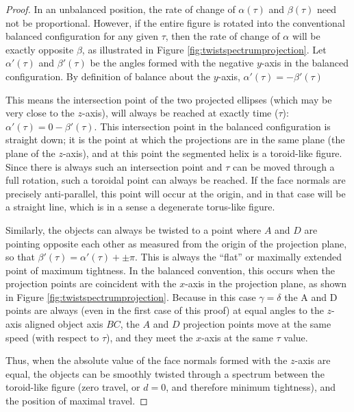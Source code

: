\documentclass[11pt]{article}
\begin{document}
{\begin{proof}
    In an unbalanced position, the rate of change of $\alpha(\tau)$ and $\beta(\tau)$
    need not be proportional.
    However, if the entire figure is rotated into
    the conventional balanced configuration for any given $\tau$, then the rate of
    change of $\alpha$ will be exactly opposite $\beta$,
    as illustrated in Figure \ref{fig:twistspectrumprojection}. Let $\alpha'(\tau)$ and $\beta'(\tau)$ be the angles
    formed with the negative $y$-axis in the balanced configuration. By definition of balance about the $y$-axis,
    $\alpha'(\tau) = -\beta'(\tau)$

    This means the
    intersection point of the two projected ellipses (which may be very close to the
    $z$-axis), will always be reached at exactly time ($\tau$): $\alpha'(\tau) = 0 - \beta'(\tau)$.
    This intersection point
    in the balanced configuration is straight down; it is the point at which the projections
    are in the same plane (the plane of the $z$-axis), and at this point the segmented
    helix is a toroid-like figure. Since there is always such an intersection point
    and  $\tau$ can be moved through a full rotation, such a toroidal point can always be reached.
    If the face normals are precisely anti-parallel, this point will occur at the origin,
    and in that case will be a straight line, which is in a sense a degenerate torus-like figure.

    Similarly, the objects can always be twisted to a point where $A$ and $D$ are pointing opposite each other
    as measured from the origin of the projection plane, so that
    $\beta'(\tau) = \alpha'(\tau) + \pm \pi$.
    This is always the ``flat'' or maximally
    extended point of maximum tightness.
    In the balanced convention, this occurs when the projection points are
    coincident with the $x$-axis in the projection plane, as shown in Figure \ref{fig:twistspectrumprojection}.
    Because in this case $\gamma = \delta$ the A and D points are always (even in the first case of this proof)
    at equal angles to the $z$-axis aligned object axis $BC$, the $A$ and $D$ projection points move
    at the same speed (with respect to $\tau$), and they meet the $x$-axis at the same $\tau$ value.

    Thus, when the absolute value of the face normals formed with the $z$-axis are equal,
    the objects can be smoothly twisted through a spectrum between the toroid-like
    figure (zero travel, or $d = 0$, and therefore minimum tightness), and the position of maximal travel.


\end{proof}}
\end{document}
